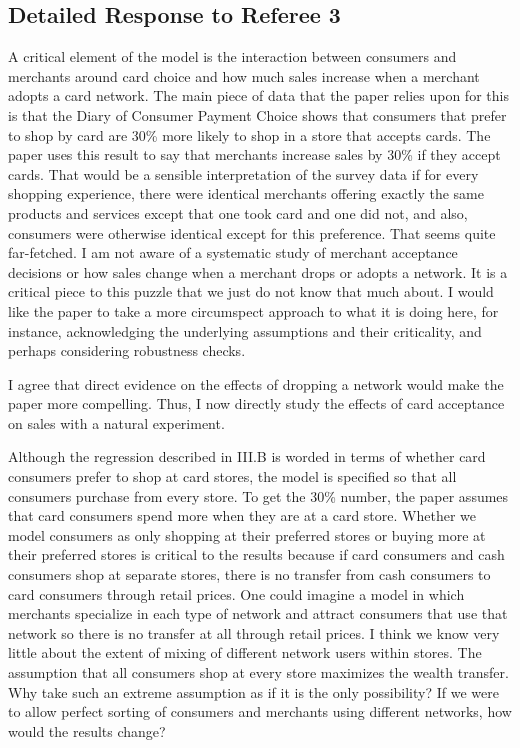\documentclass[main.tex]{subfiles}
\begin{document}

\begin{refsection}
\section*{Detailed Response to Referee 3}

\begin{refcommentnoclear}
    A critical element of the model is the interaction between consumers and merchants around card choice and how much sales increase when a merchant adopts a card network.
The main piece of data that the paper relies upon for this is that the Diary of Consumer Payment Choice shows that consumers that prefer to shop by card are 30\% more likely to shop in a store that accepts cards.
The paper uses this result to say that merchants increase sales by 30\% if they accept cards.
That would be a sensible interpretation of the survey data if for every shopping experience, there were identical merchants offering exactly the same products and services except that one took card and one did not, and also, consumers were otherwise identical except for this preference.
That seems quite far-fetched.
I am not aware of a systematic study of merchant acceptance decisions or how sales change when a merchant drops or adopts a network.
It is a critical piece to this puzzle that we just do not know that much about.
I would like the paper to take a more circumspect approach to what it is doing here, for instance, acknowledging the underlying assumptions and their criticality, and perhaps considering robustness checks.
\end{refcommentnoclear}

I agree that direct evidence on the effects of dropping a network would make the paper more compelling.
Thus, I now directly study the effects of card acceptance on sales with a natural experiment.
\replymerchanttypes

\begin{refcomment}
Although the regression described in III.B is worded in terms of whether card consumers prefer to shop at card stores, the model is specified so that all consumers purchase from every store.
To get the 30\% number, the paper assumes that card consumers spend more when they are at a card store.
Whether we model consumers as only shopping at their preferred stores or buying more at their preferred stores is critical to the results because if card consumers and cash consumers shop at separate stores, there is no transfer from cash consumers to card consumers through retail prices.
One could imagine a model in which merchants specialize in each type of network and attract consumers that use that network so there is no transfer at all through retail prices.
I think we know very little about the extent of mixing of different network users within stores.
The assumption that all consumers shop at every store maximizes the wealth transfer.
Why take such an extreme assumption as if it is the only possibility?
If we were to allow perfect sorting of consumers and merchants using different networks, how would the results change?
\end{refcomment}


\end{refsection}
\end{document}

